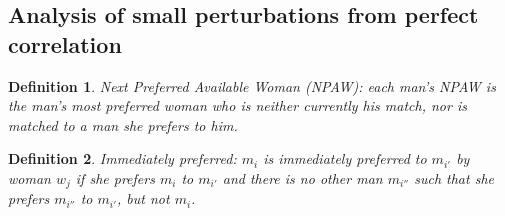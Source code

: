 \documentclass[WP]{AEA}
\newtheorem{deff}{Definition}
\begin{document}
\subsection{Analysis of small perturbations from perfect correlation}
\begin{deff}
	Next Preferred Available Woman (NPAW): each man's NPAW is the man's most preferred woman who is neither currently his match, nor is matched to a man she prefers to him. 
\end{deff}

\begin{deff}
	Immediately preferred: $m_i$ is immediately preferred to $m_{i'}$ by woman $w_j$ if she prefers  $m_{i}$ to $m_{i'}$ and there is no other man $m_{i''}$ such that she prefers $m_{i''}$ to $m_{i'}$, but not $m_{i}$.
\end{deff}
\end{document}
